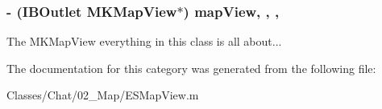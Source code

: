 \subsubsection[{map\+View}]{\setlength{\rightskip}{0pt plus 5cm}-\/ (I\+B\+Outlet M\+K\+Map\+View$\ast$) map\+View\hspace{0.3cm}{\ttfamily [read]}, {\ttfamily [write]}, {\ttfamily [nonatomic]}, {\ttfamily [strong]}}\label{category_e_s_map_view_07_08_a90f7e5b2e28913444e25de8297cf4932}
The M\+K\+Map\+View everything in this class is all about... 

The documentation for this category was generated from the following file\+:\begin{DoxyCompactItemize}
\item 
Classes/\+Chat/02\+\_\+\+Map/E\+S\+Map\+View.\+m\end{DoxyCompactItemize}
